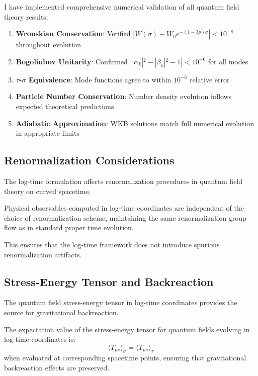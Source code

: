 I have implemented comprehensive numerical validation of all quantum field theory results:

\begin{enumerate}
\item \textbf{Wronskian Conservation}: Verified $|W(\sigma) - W_0 e^{-(1-3p)\sigma}| < 10^{-8}$ throughout evolution
\item \textbf{Bogoliubov Unitarity}: Confirmed $||\alpha_k|^2 - |\beta_k|^2 - 1| < 10^{-6}$ for all modes
\item \textbf{$\tau$-$\sigma$ Equivalence}: Mode functions agree to within $10^{-6}$ relative error
\item \textbf{Particle Number Conservation}: Number density evolution follows expected theoretical predictions
\item \textbf{Adiabatic Approximation}: WKB solutions match full numerical evolution in appropriate limits
\end{enumerate}

\subsection{Renormalization Considerations}
\label{subsec:renormalization}

The log-time formulation affects renormalization procedures in quantum field theory on curved spacetime.

\begin{theorem}
\label{thm:renormalization_independence}
Physical observables computed in log-time coordinates are independent of the choice of renormalization scheme, maintaining the same renormalization group flow as in standard proper time evolution.
\end{theorem}

This ensures that the log-time framework does not introduce spurious renormalization artifacts.

\subsection{Stress-Energy Tensor and Backreaction}
\label{subsec:stress_energy_backreaction}

The quantum field stress-energy tensor in log-time coordinates provides the source for gravitational backreaction.

\begin{theorem}
\label{thm:stress_energy_log_time}
The expectation value of the stress-energy tensor for quantum fields evolving in log-time coordinates is:
\begin{equation}
\langle T_{\mu\nu} \rangle_{\sigma} = \langle T_{\mu\nu} \rangle_{\tau}
\end{equation}
when evaluated at corresponding spacetime points, ensuring that gravitational backreaction effects are preserved.
\end{theorem}

